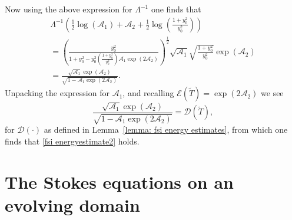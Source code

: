\documentclass[a4paper]{amsart}
\numberwithin{equation}{section}
\theoremstyle{plain}
\begin{document}
Now using the above expression for $\Lambda^{-1}$ one finds that
\begin{multline*}
    \Lambda^{-1}\left(  \frac{1}{2} \log(\mathcal{A}_1) + \mathcal{A}_2 + \frac{1}{2} \log\left( \frac{1 + y_0^2}{y_0^2} \right) \right)\\
    = \left( \frac{y_0^2}{1 + y_0^2 - y_0^2 \left( \frac{1 + y_0^2}{y_0^2} \right)\mathcal{A}_1  \exp(2 \mathcal{A}_2)} \right)^{\frac{1}{2}} \sqrt{\mathcal{A}_1} \sqrt{\frac{1 + y_0^2}{y_0^2}} \exp(\mathcal{A}_2)\\
    = \frac{\sqrt{\mathcal{A}_1} \exp(\mathcal{A}_2)}{\sqrt{1 -\mathcal{A}_1 \exp(2 \mathcal{A}_2)}}.
\end{multline*}
Unpacking the expression for $\mathcal{A}_1$, and recalling $\mathcal{E}(\widetilde{T}) = \exp(2 \mathcal{A}_2)$ we see
\begin{equation*}
    \frac{\sqrt{\mathcal{A}_1} \exp(\mathcal{A}_2)}{\sqrt{1 -\mathcal{A}_1 \exp(2 \mathcal{A}_2)}} = \mathcal{D}(\widetilde{T}),
\end{equation*}
for $\mathcal{D}(\cdot)$ as defined in Lemma~\ref{lemma: fsi energy estimates}, from which one finds that \eqref{fsi energyestimate2} holds.

\section{The Stokes equations on an evolving domain}
\label{appendix:stokes}
\end{document}
